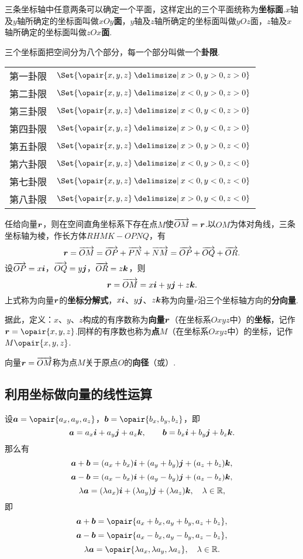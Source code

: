 三条坐标轴中任意两条可以确定一个平面，这样定出的三个平面统称为\textbf{坐标面}.\(x\)轴及\(y\)轴所确定的坐标面叫做\textbf{\(xOy\)面}，\(y\)轴及\(z\)轴所确定的坐标面叫做\(yOz\)面，\(z\)轴及\(x\)轴所确定的坐标面叫做\textbf{\(zOx\)面}.

三个坐标面把空间分为八个部分，每一个部分叫做一个\textbf{卦限}.

\begin{center}
\def\guaxian#1#2#3{\Set{ \opair{x,y,z} \given x #1 0, y #2 0, z #3 0 }}%
\def\arraystretch{1.2}%
\begin{tabular}{cl}%
第一卦限 & \(\guaxian{>}{>}{>}\) \\
第二卦限 & \(\guaxian{<}{>}{>}\) \\
第三卦限 & \(\guaxian{<}{<}{>}\) \\
第四卦限 & \(\guaxian{>}{<}{>}\) \\
第五卦限 & \(\guaxian{>}{>}{<}\) \\
第六卦限 & \(\guaxian{<}{>}{<}\) \\
第七卦限 & \(\guaxian{<}{<}{<}\) \\
第八卦限 & \(\guaxian{>}{<}{<}\) \\
\end{tabular}%
\end{center}

任给向量\(\boldsymbol{r}\)，则在空间直角坐标系下存在点\(M\)使\(\overrightarrow{OM}=\boldsymbol{r}\).以\(OM\)为体对角线，三条坐标轴为棱，作长方体\(RHMK-OPNQ\)，有\[
\boldsymbol{r}=\overrightarrow{OM}=\overrightarrow{OP}+\overrightarrow{PN}+\overrightarrow{NM}=\overrightarrow{OP}+\overrightarrow{OQ}+\overrightarrow{OR}.
\]设\(\overrightarrow{OP}=x\boldsymbol{i}\)，\(\overrightarrow{OQ}=y\boldsymbol{j}\)，\(\overrightarrow{OR}=z\boldsymbol{k}\)，则\[
\boldsymbol{r}=\overrightarrow{OM}=x\boldsymbol{i}+y\boldsymbol{j}+z\boldsymbol{k}.
\]上式称为向量\(\boldsymbol{r}\)的\textbf{坐标分解式}，\(x\boldsymbol{i}\)、\(y\boldsymbol{j}\)、\(z\boldsymbol{k}\)称为向量\(r\)沿三个坐标轴方向的\textbf{分向量}.

据此，定义：\(x\)、\(y\)、\(z\)构成的有序数称为\textbf{向量\(\boldsymbol{r}\)}（在坐标系\(Oxyz\)中）的\textbf{坐标}，记作\(\mat{r}=\opair{x,y,z}\).同样的有序数也称为\textbf{点\(M\)}（在坐标系\(Oxyz\)中）的坐标，记作\(M\opair{x,y,z}\).

向量\(\boldsymbol{r}=\overrightarrow{OM}\)称为点\(M\)关于原点\(O\)的\textbf{向径}（或）.

\subsection{利用坐标做向量的线性运算}
设\(\mat{a}=\opair{a_x,a_y,a_z}\)，\(\mat{b}=\opair{b_x,b_y,b_z}\)，即\[
\boldsymbol{a}=a_x\boldsymbol{i}+a_y\boldsymbol{j}+a_z\boldsymbol{k},
\qquad
\boldsymbol{b}=b_x\boldsymbol{i}+b_y\boldsymbol{j}+b_z\boldsymbol{k}.
\]那么有\[
\boldsymbol{a}+\boldsymbol{b}=(a_x+b_x)\boldsymbol{i}+(a_y+b_y)\boldsymbol{j}+(a_z+b_z)\boldsymbol{k},
\]\[
\boldsymbol{a}-\boldsymbol{b}=(a_x-b_x)\boldsymbol{i}+(a_y-b_y)\boldsymbol{j}+(a_z-b_z)\boldsymbol{k},
\]\[
\lambda\boldsymbol{a}=(\lambda a_x)\boldsymbol{i}+(\lambda a_y)\boldsymbol{j}+(\lambda a_z)\boldsymbol{k}, \quad \lambda\in\mathbb{R},
\]即\[
\mat{a}+\mat{b}=\opair{a_x+b_x,a_y+b_y,a_z+b_z},
\]\[
\mat{a}-\mat{b}=\opair{a_x-b_x,a_y-b_y,a_z-b_z},
\]\[
\lambda\mat{a}=\opair{\lambda a_x,\lambda a_y,\lambda a_z}, \quad \lambda\in\mathbb{R}.
\]

